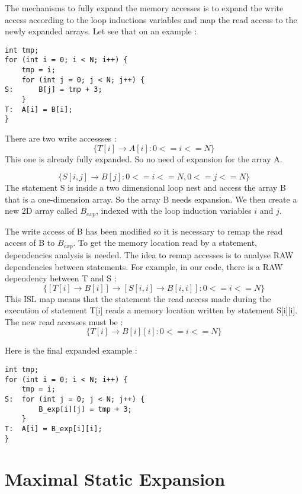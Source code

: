 The mechanisms to fully expand the memory accesses is to expand the write access according to the loop inductions variables and map the read access to the newly expanded arrays. Let see that on an example :

\begin{lstlisting}[frame=single]
int tmp;
for (int i = 0; i < N; i++) {
    tmp = i;
    for (int j = 0; j < N; j++) {
S:      B[j] = tmp + 3;
    }
T:  A[i] = B[i];
}
\end{lstlisting}

There are two write accessses :
\[
\{T[i] \rightarrow A[i]:0<=i<=N\}
\]
This one is already fully expanded. So no need of expansion for the array A.

\[
\{S[i,j] \rightarrow B[j]:0<=i<=N,0<=j<=N\}
\]
The statement S is inside a two dimensional loop nest and access the array B that is a one-dimension array. So the array B needs expansion. We then create a new 2D array called $B_{exp}$, indexed with the loop induction variables $i$ and $j$.

The write access of B has been modified so it is necessary to remap the read access of B to $B_{exp}$. To get the memory location read by a statement, dependencies analysis is needed. The idea to remap accesses is to analyse \ac{RAW} dependencies between statements. For example, in our code, there is a \ac{RAW} dependency between T and S :
\[
\{[T[i] \rightarrow B[i]] \rightarrow [S[i,i] \rightarrow B[i,i]]:0<=i<=N\}
\]
This \ac{ISL} map means that the statement the read access made during the execution of statement T[i] reads a memory location written by statement S[i][i]. The new read accesses must be :
 \[
\{T[i] \rightarrow B[i][i]:0<=i<=N\}
\]

Here is the final expanded example :
\begin{lstlisting}[frame=single]
int tmp;
for (int i = 0; i < N; i++) {
    tmp = i;
S:  for (int j = 0; j < N; j++) {
        B_exp[i][j] = tmp + 3;
    }
T:  A[i] = B_exp[i][i];
}
\end{lstlisting}


\section{Maximal Static Expansion}
